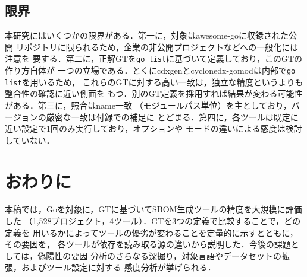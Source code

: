 \documentclass{css}
\def\|{\verb|}
\begin{document}
\subsection{限界}
本研究にはいくつかの限界がある．第一に，対象はawesome-goに収録された公開
リポジトリに限られるため，企業の非公開プロジェクトなどへの一般化には注意を
要する．第二に，正解GTを\|go list|に基づいて定義しており，このGTの作り方自体が
一つの立場である．とくにcdxgenとcyclonedx-gomodは内部で\|go list|を用いるため，
これらのGTに対する高い一致は，独立な精度というよりも整合性の確認に近い側面を
もつ．別のGT定義を採用すれば結果が変わる可能性がある．第三に，照合はname一致
（モジュールパス単位）を主としており，バージョンの厳密な一致は付録での補足に
とどまる．第四に，各ツールは既定に近い設定で1回のみ実行しており，オプションや
モードの違いによる感度は検討していない．

\section{おわりに}
本稿では，Goを対象に，GTに基づいてSBOM生成ツールの精度を大規模に評価した
（1{,}528プロジェクト，4ツール）．GTを3つの定義で比較することで，どの定義を
用いるかによってツールの優劣が変わることを定量的に示すとともに，その要因を，
各ツールが依存を読み取る源の違いから説明した．今後の課題としては，偽陽性の要因
分析のさらなる深掘り，対象言語やデータセットの拡張，およびツール設定に対する
感度分析が挙げられる．

\end{document}
